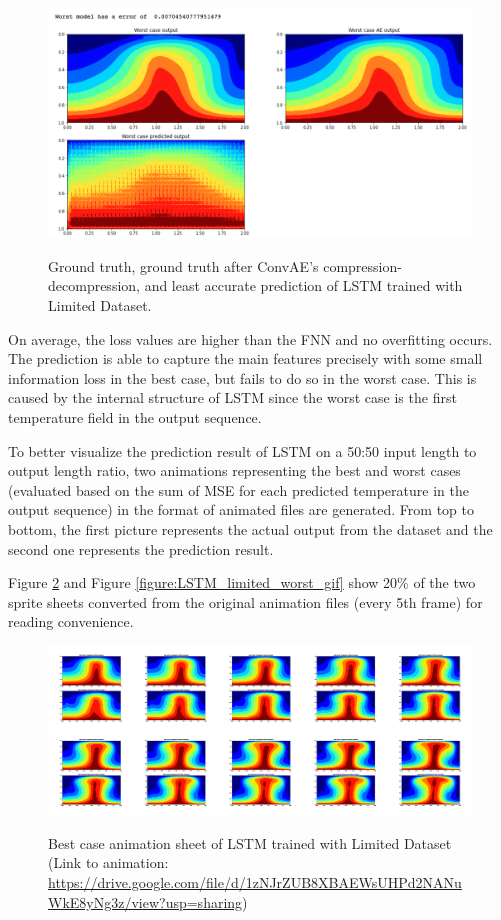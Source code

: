 \begin{figure}[H]
    \caption{Ground truth, ground truth after ConvAE's compression-decompression, and least accurate prediction of LSTM trained with Limited Dataset.}
    \includegraphics[scale=0.5]{figures/mantle_convection_images/limited_dataset/LSTM_Worst.png}
    \label{figure:LSTM_limited_worst}
\end{figure}

On average, the loss values are higher than the FNN and no overfitting occurs. The prediction is able to capture the main features precisely with some small information loss in the best case, but fails to do so in the worst case. This is caused by the internal structure of LSTM since the worst case is the first temperature field in the output sequence.

To better visualize the prediction result of LSTM on a 50:50 input length to output length ratio, two animations representing the best and worst cases (evaluated based on the sum of MSE for each predicted temperature in the output sequence) in the format of animated files are generated. From top to bottom, the first picture represents the actual output from the dataset and the second one represents the prediction result.

Figure \ref{figure:LSTM_limited_best_gif} and Figure \ref{figure:LSTM_limited_worst_gif} show 20\% of the two sprite sheets converted from the original animation files (every 5th frame) for reading convenience.

\begin{figure}[H]
    \centering
    \caption{Best case animation sheet of LSTM trained with Limited Dataset (Link to animation: \url{https://drive.google.com/file/d/1zNJrZUB8XBAEWsUHPd2NANuWkE8yNg3z/view?usp=sharing})}
    \includegraphics[scale=0.10]{figures/mantle_convection_images/limited_dataset/LSTM_Best_GIF_sheet.png}
    \label{figure:LSTM_limited_best_gif}
\end{figure}



